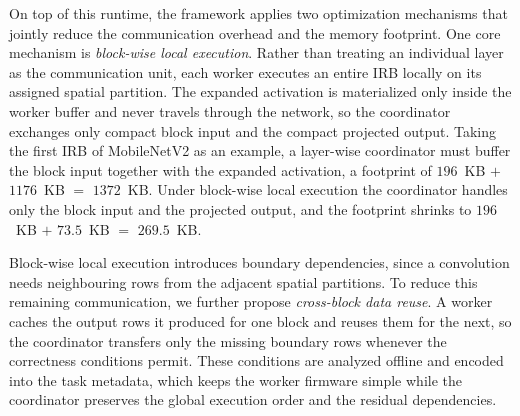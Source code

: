 On top of this runtime, the framework applies two optimization mechanisms that jointly reduce the communication overhead and the memory footprint. One core mechanism is \emph{block-wise local execution}. Rather than treating an individual layer as the communication unit, each worker executes an entire IRB locally on its assigned spatial partition.
The expanded activation is materialized only inside the worker buffer and never travels through the network, so the coordinator exchanges only compact block input and the compact projected output.
Taking the first IRB of MobileNetV2 as an example, a layer-wise coordinator must buffer the block input together with the expanded activation, a footprint of $196$~KB $+$ $1176$~KB $=$ $1372$~KB.
Under block-wise local execution the coordinator handles only the block input and the projected output, and the footprint shrinks to $196$~KB $+$ $73.5$~KB $=$ $269.5$~KB.

Block-wise local execution introduces boundary dependencies, since a convolution needs neighbouring rows from the adjacent spatial partitions.
To reduce this remaining communication, we further propose \emph{cross-block data reuse}. 
A worker caches the output rows it produced for one block and reuses them for the next, so the coordinator transfers only the missing boundary rows whenever the correctness conditions permit.
These conditions are analyzed offline and encoded into the task metadata, which keeps the worker firmware simple while the coordinator preserves the global execution order and the residual dependencies.

